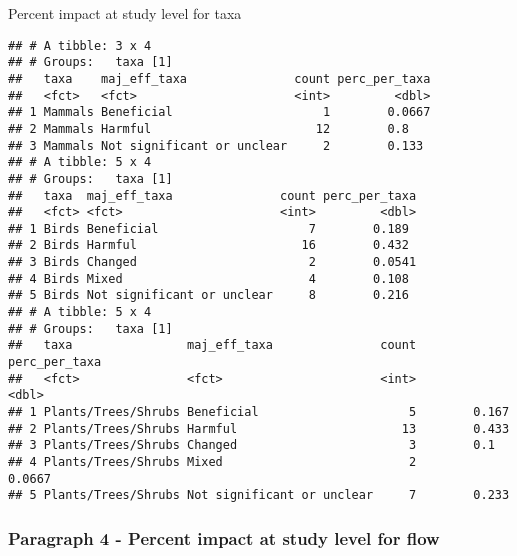 \documentclass[
]{article}
\newenvironment{Shaded}{\begin{snugshade}}{\end{snugshade}}
\newcommand{\KeywordTok}[1]{\textcolor[rgb]{0.13,0.29,0.53}{\textbf{#1}}}
\newcommand{\NormalTok}[1]{#1}
\newcommand{\OperatorTok}[1]{\textcolor[rgb]{0.81,0.36,0.00}{\textbf{#1}}}
\newcommand{\StringTok}[1]{\textcolor[rgb]{0.31,0.60,0.02}{#1}}
\begin{document}
Percent impact at study level for taxa

\begin{Shaded}
\end{Shaded}

\begin{verbatim}
## # A tibble: 3 x 4
## # Groups:   taxa [1]
##   taxa    maj_eff_taxa               count perc_per_taxa
##   <fct>   <fct>                      <int>         <dbl>
## 1 Mammals Beneficial                     1        0.0667
## 2 Mammals Harmful                       12        0.8   
## 3 Mammals Not significant or unclear     2        0.133 
## # A tibble: 5 x 4
## # Groups:   taxa [1]
##   taxa  maj_eff_taxa               count perc_per_taxa
##   <fct> <fct>                      <int>         <dbl>
## 1 Birds Beneficial                     7        0.189 
## 2 Birds Harmful                       16        0.432 
## 3 Birds Changed                        2        0.0541
## 4 Birds Mixed                          4        0.108 
## 5 Birds Not significant or unclear     8        0.216 
## # A tibble: 5 x 4
## # Groups:   taxa [1]
##   taxa                maj_eff_taxa               count perc_per_taxa
##   <fct>               <fct>                      <int>         <dbl>
## 1 Plants/Trees/Shrubs Beneficial                     5        0.167 
## 2 Plants/Trees/Shrubs Harmful                       13        0.433 
## 3 Plants/Trees/Shrubs Changed                        3        0.1   
## 4 Plants/Trees/Shrubs Mixed                          2        0.0667
## 5 Plants/Trees/Shrubs Not significant or unclear     7        0.233
\end{verbatim}

\hypertarget{paragraph-4---percent-impact-at-study-level-for-flow}{%
\subsubsection{Paragraph 4 - Percent impact at study level for
flow}\label{paragraph-4---percent-impact-at-study-level-for-flow}}
\end{document}
